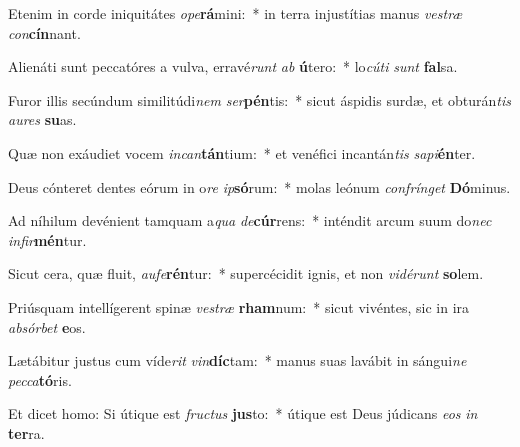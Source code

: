 \item Etenim in corde iniquitátes \textit{o}\textit{pe}\textbf{rá}mini:~* in terra injustítias manus \textit{ves}\textit{træ} \textit{con}\textbf{cín}nant.
\item Alienáti sunt peccatóres a vulva, erravé\textit{runt} \textit{ab} \textbf{ú}tero:~* lo\textit{cú}\textit{ti} \textit{sunt} \textbf{fal}sa.
\item Furor illis secúndum similitúdi\textit{nem} \textit{ser}\textbf{pén}tis:~* sicut áspidis surdæ, et obturán\textit{tis} \textit{au}\textit{res} \textbf{su}as.
\item Quæ non exáudiet vocem \textit{in}\textit{can}\textbf{tán}tium:~* et venéfici incantán\textit{tis} \textit{sa}\textit{pi}\textbf{én}ter.
\item Deus cónteret dentes eórum in o\textit{re} \textit{ip}\textbf{só}rum:~* molas leónum \textit{con}\textit{frín}\textit{get} \textbf{Dó}minus.
\item Ad níhilum devénient tamquam a\textit{qua} \textit{de}\textbf{cúr}rens:~* inténdit arcum suum do\textit{nec} \textit{in}\textit{fir}\textbf{mén}tur.
\item Sicut cera, quæ fluit, \textit{au}\textit{fe}\textbf{rén}tur:~* supercécidit ignis, et non \textit{vi}\textit{dé}\textit{runt} \textbf{so}lem.
\item Priúsquam intellígerent spinæ \textit{ves}\textit{træ} \textbf{rham}num:~* sicut vivéntes, sic in ira \textit{ab}\textit{sór}\textit{bet} \textbf{e}os.
\item Lætábitur justus cum víde\textit{rit} \textit{vin}\textbf{díc}tam:~* manus suas lavábit in sángui\textit{ne} \textit{pec}\textit{ca}\textbf{tó}ris.
\item Et dicet homo: Si útique est \textit{fruc}\textit{tus} \textbf{jus}to:~* útique est Deus júdicans \textit{e}\textit{os} \textit{in} \textbf{ter}ra.
